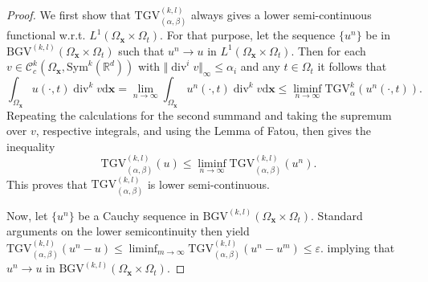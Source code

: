\documentclass[10pt,a4paper]{amsart}
\newcommand{\BGV}{\mathrm{BGV}}
\DeclareMathOperator{\Div}{div}
\newcommand{\OmegaSpace}{\Omega_\mathbf{x}}
\newcommand{\OmegaTime}{\Omega_t}
\newcommand{\R}{\mathbb{R}}
\newcommand{\TGV}{\mathrm{TGV}}
\newcommand{\dx}{\mathrm{d}}
\begin{document}
	\begin{proof}
		We first show that $\TGV_{(\alpha, \beta)}^{(k,l)}$ always gives a lower semi-continuous functional w.r.t. $L^1(\OmegaSpace\times \OmegaTime)$. For that purpose, let the sequence $\lbrace u^n\rbrace$ be in $\BGV^{(k,l)}(\OmegaSpace \times\OmegaTime)$ such that $u^n \rightarrow u$ in $L^1(\OmegaSpace\times \OmegaTime)$. Then for each $v \in \mathcal{C}_c^k(\OmegaSpace, \mathrm{Sym}^k(\R^d))$ with $\Vert \Div^i v\Vert _\infty\leq \alpha_i$ and any $t \in \OmegaTime$ it follows that
		\begin{equation*}
			\int_{\OmegaSpace}u(\cdot, t) \Div^k v \dx \mathbf{x} = \lim_{n\rightarrow\infty} \int_{\OmegaSpace}u^n(\cdot,t) \Div^k v \dx \mathbf{x}  \leq \liminf_{n\rightarrow \infty} \TGV_\alpha^k\left( u^n(\cdot, t) \right).
		\end{equation*}
		Repeating the calculations for the second summand and taking the supremum over $v$, respective integrals, and using the Lemma of Fatou, then gives the inequality
		\begin{equation*}
			\TGV_{(\alpha, \beta)}^{(k,l)}(u) \leq \liminf_{n\rightarrow\infty} \TGV_{(\alpha, \beta)}^{(k,l)}(u^n).
		\end{equation*}
		This proves that $\TGV_{(\alpha, \beta)}^{(k,l)}$ is lower semi-continuous.
		
		Now, let $\lbrace u^n \rbrace$ be a Cauchy sequence in $\BGV^{(k,l)}(\OmegaSpace \times\OmegaTime)$.
		Standard arguments on the lower semicontinuity then yield
		$
		\TGV_{(\alpha, \beta)}^{(k,l)}(u^n - u) \leq \liminf_{m \rightarrow \infty} \TGV_{(\alpha, \beta)}^{(k,l)}(u^n - u^m) \leq \varepsilon.
		$
		implying that $u^n \rightarrow u$ in $\BGV^{(k,l)}(\OmegaSpace \times\OmegaTime)$.
	\end{proof}
\end{document}
